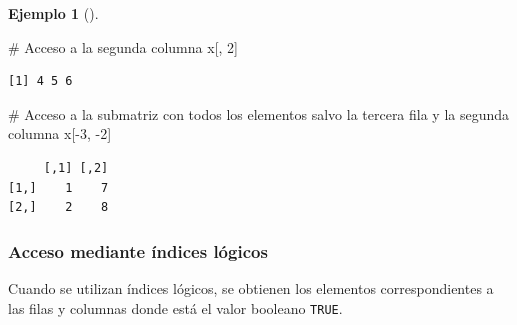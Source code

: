 \documentclass[
  a4paper,
]{scrreport}
\newenvironment{Shaded}{\begin{snugshade}}{\end{snugshade}}
\newcommand{\CommentTok}[1]{\textcolor[rgb]{0.37,0.37,0.37}{#1}}
\newcommand{\DecValTok}[1]{\textcolor[rgb]{0.68,0.00,0.00}{#1}}
\newcommand{\NormalTok}[1]{\textcolor[rgb]{0.00,0.23,0.31}{#1}}
\newcommand{\SpecialCharTok}[1]{\textcolor[rgb]{0.37,0.37,0.37}{#1}}
\theoremstyle{definition}
\theoremstyle{definition}
\newtheorem{example}{Ejemplo}[chapter]
\theoremstyle{remark}
\begin{document}
\begin{example}[]
\begin{Shaded}
\begin{Highlighting}[]
\CommentTok{\# Acceso a la segunda columna}
\NormalTok{x[, }\DecValTok{2}\NormalTok{]}
\end{Highlighting}
\end{Shaded}

\begin{verbatim}
[1] 4 5 6
\end{verbatim}

\begin{Shaded}
\begin{Highlighting}[]
\CommentTok{\# Acceso a la submatriz con todos los elementos salvo la tercera fila y la segunda columna}
\NormalTok{x[}\SpecialCharTok{{-}}\DecValTok{3}\NormalTok{, }\SpecialCharTok{{-}}\DecValTok{2}\NormalTok{]}
\end{Highlighting}
\end{Shaded}

\begin{verbatim}
     [,1] [,2]
[1,]    1    7
[2,]    2    8
\end{verbatim}

\end{example}

\hypertarget{acceso-mediante-uxedndices-luxf3gicos}{%
\subsubsection{Acceso mediante índices
lógicos}\label{acceso-mediante-uxedndices-luxf3gicos}}

Cuando se utilizan índices lógicos, se obtienen los elementos
correspondientes a las filas y columnas donde está el valor booleano
\texttt{TRUE}.
\end{document}
